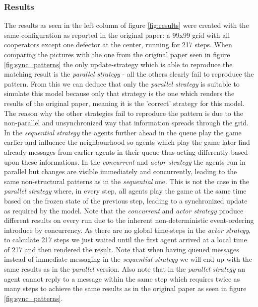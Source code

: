 \subsubsection{Results}
The results as seen in the left column of figure \ref{fig:results} were created with the same configuration as reported in the original paper: a 99x99 grid with all cooperators except one defector at the center, running for 217 steps. When comparing the pictures with the one from the original paper seen in figure \ref{fig:sync_patterns} the only update-strategy which is able to reproduce the matching result is the \textit{parallel strategy} - all the others clearly fail to reproduce the pattern. From this we can deduce that only the \textit{parallel strategy} is suitable to simulate this model because only that strategy is the one which renders the results of the original paper, meaning it is the 'correct' strategy for this model. The reason why the other strategies fail to reproduce the pattern is due to the non-parallel and unsynchronized way that information spreads through the grid. In the \textit{sequential strategy} the agents further ahead in the queue play the game earlier and influence the neighbourhood so agents which play the game later find already messages from earlier agents in their queue thus acting differently based upon these informations. In the \textit{concurrent} and \textit{actor strategy} the agents run in parallel but changes are visible immediately and concurrently, leading to the same non-structural patterns as in the \textit{sequential} one. This is not the case in the \textit{parallel strategy}  where, in every step, all agents play the game at the same time based on the frozen state of the previous step, leading to a synchronized update as required by the model. Note that the \textit{concurrent} and \textit{actor strategy} produce different results on every run due to the inherent non-deterministic event-ordering introduce by concurrency. As there are no global time-steps in the \textit{actor strategy}, to calculate 217 steps we just waited until the first agent arrived at a local time of 217 and then rendered the result.
Note that when having queued messages instead of immediate messaging in the \textit{sequential strategy} we will end up with the same results as in the \textit{parallel} version. Also note that in the \textit{parallel strategy} an agent cannot reply to a message within the same step which requires twice as many steps to achieve the same results as in the original paper as seen in figure \ref{fig:sync_patterns}.

